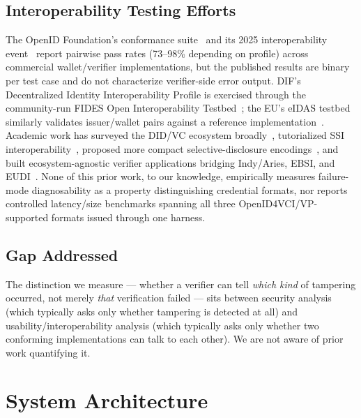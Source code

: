 \documentclass[conference]{IEEEtran}
\begin{document}
\subsection{Interoperability Testing Efforts}
The OpenID Foundation's conformance suite~\cite{oidf-conformance} and its 2025 interoperability event~\cite{oidf-interop-nov2025} report pairwise pass rates (73--98\% depending on profile) across commercial wallet/verifier implementations, but the published results are binary per test case and do not characterize verifier-side error output. DIF's Decentralized Identity Interoperability Profile is exercised through the community-run FIDES Open Interoperability Testbed~\cite{diip-fides}; the EU's eIDAS testbed similarly validates issuer/wallet pairs against a reference implementation~\cite{eidas-testbed}. Academic work has surveyed the DID/VC ecosystem broadly~\cite{mazzocca-survey}, tutorialized SSI interoperability~\cite{ssi-tutorial}, proposed more compact selective-disclosure encodings~\cite{buldini-csdjwt}, and built ecosystem-agnostic verifier applications bridging Indy/Aries, EBSI, and EUDI~\cite{interid}. None of this prior work, to our knowledge, empirically measures failure-mode diagnosability as a property distinguishing credential formats, nor reports controlled latency/size benchmarks spanning all three OpenID4VCI/VP-supported formats issued through one harness.

\subsection{Gap Addressed}
The distinction we measure --- whether a verifier can tell \emph{which kind} of tampering occurred, not merely \emph{that} verification failed --- sits between security analysis (which typically asks only whether tampering is detected at all) and usability/interoperability analysis (which typically asks only whether two conforming implementations can talk to each other). We are not aware of prior work quantifying it.

\section{System Architecture}
\end{document}
